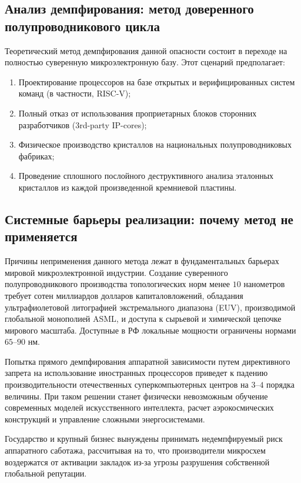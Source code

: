 \documentclass[12pt,a4paper]{article}
\begin{document}
\subsection{Анализ демпфирования: метод доверенного полупроводникового цикла}

Теоретический метод демпфирования данной опасности состоит в переходе на полностью суверенную микроэлектронную базу. Этот сценарий предполагает:
\begin{enumerate}[leftmargin=2em, itemsep=0.2em]
    \item Проектирование процессоров на базе открытых и 
    верифицированных систем команд (в частности, RISC-V);
    \item Полный отказ от использования проприетарных блоков 
    сторонних разработчиков (3rd-party IP-cores);
    \item Физическое производство кристаллов на национальных 
    полупроводниковых фабриках;
    \item Проведение сплошного послойного деструктивного анализа 
    эталонных кристаллов из каждой произведенной кремниевой пластины.
\end{enumerate}

\subsection{Системные барьеры реализации: почему метод не применяется}

Причины неприменения данного метода лежат в фундаментальных барьерах 
мировой микроэлектронной индустрии. Создание суверенного 
полупроводникового производства топологических норм менее $10$ 
нанометров требует сотен миллиардов долларов капиталовложений, 
обладания ультрафиолетовой литографией экстремального диапазона (EUV), 
производимой глобальной монополией ASML, и доступа к сырьевой и 
химической цепочке мирового масштаба. Доступные в РФ локальные мощности 
ограничены нормами $65$--$90$ нм.

Попытка прямого демпфирования аппаратной зависимости путем директивного 
запрета на использование иностранных процессоров приведет к падению 
производительности отечественных суперкомпьютерных центров на $3$--$4$ 
порядка величины. При таком решении станет физически невозможным 
обучение современных моделей искусственного интеллекта, расчет 
аэрокосмических конструкций и управление сложными энергосистемами. 

Государство и крупный бизнес вынуждены принимать недемпфируемый риск 
аппаратного саботажа, рассчитывая на то, что производители микросхем 
воздержатся от активации закладок из-за угрозы разрушения собственной 
глобальной репутации.
\end{document}
